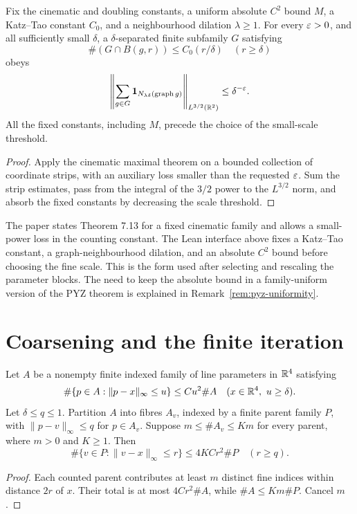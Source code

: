 \begin{theorem}
\label{thm:cinematic-l32}
\leanok
{}
Fix the cinematic and doubling constants, a uniform absolute $C^2$
bound $M$, a Katz--Tao constant $C_0$, and a neighbourhood dilation
$\lambda\geq1$. For every $\varepsilon>0$, and all sufficiently small
$\delta$, a $\delta$-separated finite subfamily $G$ satisfying
\[
       \#(G\cap B(g,r))\leq C_0(r/\delta)
       \quad(r\geq\delta)
\]
obeys
\[
       \left\|\sum_{g\in G}\mathbf{1}_{N_{\lambda\delta}(\operatorname{graph} g)}
       \right\|_{L^{3/2}(\mathbb{R}^2)}\leq\delta^{-\varepsilon}.
\]
All the fixed constants, including $M$, precede the choice of the
small-scale threshold.
\end{theorem}
\begin{proof}
\leanok
Apply the cinematic maximal theorem on a bounded collection of
coordinate strips, with an auxiliary loss smaller than the requested
$\varepsilon$. Sum the strip estimates, pass from the integral of the
$3/2$ power to the $L^{3/2}$ norm, and absorb the fixed constants
by decreasing the scale threshold.
\end{proof}

\begin{remark}
\label{rem:cinematic-normalization}
The paper states Theorem 7.13 for a fixed cinematic family and allows
a small-power loss in the counting constant. The Lean interface
above fixes a Katz--Tao constant, a graph-neighbourhood dilation, and
an absolute $C^2$ bound before choosing the fine scale. This is the
form used after selecting and rescaling the parameter blocks. The
need to keep the absolute bound in a family-uniform version of the
PYZ theorem is explained in Remark~\ref{rem:pyz-uniformity}.
\end{remark}

\section{Coarsening and the finite iteration}

\begin{lemma}
\label{lem:uniform-parameter-coarsening}
Let $A$ be a nonempty finite indexed family of line parameters in
$\mathbb{R}^4$ satisfying
\[
 \#\{p\in A:\|p-x\|_\infty\leq u\}\leq Cu^2\#A
       \quad(x\in\mathbb{R}^4,\ u\geq\delta).
\]
Let $\delta\leq q\leq1$. Partition $A$ into fibres $A_v$, indexed
by a finite parent family $P$, with
$\|p-v\|_\infty\leq q$ for $p\in A_v$. Suppose
$m\leq\#A_v\leq Km$ for every parent, where $m>0$ and $K\geq1$.
Then
\[
 \#\{v\in P:\|v-x\|_\infty\leq r\}
                       \leq4KC r^2\#P\quad(r\geq q).
\]
\end{lemma}
\begin{proof}
Each counted parent contributes at least $m$ distinct fine indices
within distance $2r$ of $x$. Their total is at most $4Cr^2\#A$,
while $\#A\leq Km\#P$. Cancel $m$.
\end{proof}

